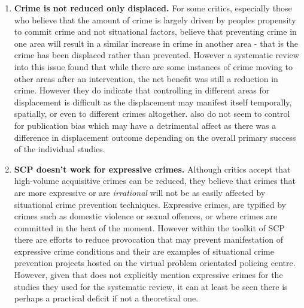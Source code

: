 \begin{enumerate}

 \item{\bf{Crime is not reduced only displaced.} }For some critics, especially those who believe that the amount of crime is largely driven by  peoples propensity to commit crime and not situational factors, believe that preventing crime in one area will result in a similar increase in crime in another area - that is the crime has been displaced rather than prevented. However a systematic review into this issue \parencite{guerette2009assessing} found that while there are some instances of crime moving to other areas after an intervention, the net benefit was still a reduction in crime. However they do indicate that controlling in different areas for displacement is difficult as the displacement may manifest itself temporally, spatially, or even to different crimes altogether. \textcite{guerette2009assessing} also do not seem to control for publication bias which may have a detrimental affect as there was a difference in displacement outcome depending on the overall primary success of the individual studies. 
 
 \item{\bf{SCP doesn't work for expressive crimes.}} Although critics accept that high-volume acquisitive crimes can be reduced, they believe that crimes that are more expressive or are \emph{irrational} will not be as easily affected by  situational crime prevention techniques. Expressive crimes, are typified by crimes such as domestic violence or sexual offences, or where crimes are committed in the heat of the moment. However within the toolkit of SCP there are efforts to reduce provocation that may prevent manifestation of expressive crime conditions and their are examples of situational crime prevention projects hosted on the virtual problem orientated policing centre. However, given that \parencite{guerette2009assessing} does not explicitly mention expressive crimes for the studies they used for the systematic review, it can at least be seen there is perhaps a practical deficit if not a theoretical one. 
 
 \end{enumerate}


